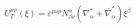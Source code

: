 \begin{equation}
U_T^{\mu \rho }(\xi )=\varepsilon ^{\mu \nu \rho }
N_{\beta\nu}^\alpha (\nabla^*_{\alpha }+\bar{\nabla}^*_{\alpha
})\xi^\beta %
\end{equation}

